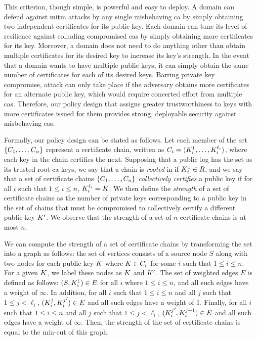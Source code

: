 This criterion, though simple, is powerful and easy to deploy. A domain can
defend against \ac{mitm} attacks by any single misbehaving \ac{ca} by simply
obtaining two independent certificates for its public key. Each domain can tune
its level of resilience against colluding compromised \acp{ca} by simply
obtaining more certificates for its key. Moreover, a domain does not need to do
anything other than obtain multiple certificates for its desired key to increase
its key's strength. In the event that a domain wants to have multiple public
keys, it can simply obtain the same number of certificates for each of its
desired keys. Barring private key compromise,  attack can only take
place if the adversary obtains more certificates for an alternate public key,
which would require concerted effort from multiple \acp{ca}. Therefore, our
policy design that assigns greater trustworthiness to keys with more
certificates issued for them provides strong, deployable security against
misbehaving \acp{ca}.

Formally, our policy design can be stated as follows. Let each member of the set
$\{C_1, \ldots, C_n\}$ represent a certificate chain, written
as $C_i = (K_i^1, \ldots, K_i^{\ell_i})$, where each key in the
chain certifies the next. Supposing that a public log has the set \rootset as
its trusted root \ac{ca} keys, we say that a chain is \emph{rooted} in \rootset
if $K_i^1 \in R$, and we say that a set of certificate chains
$\{C_1, \ldots, C_n\}$ \emph{collectively certifies} a public
key \pk if for all $i$ such that $1 \le i \le n$, $K_i^{\ell_i} = K$. We
then define the \emph{strength} of a set of certificate chains as the number of
private keys corresponding to a public key in the set of chains that must be
compromised to collectively certify a different public key $K'$. We
observe that the strength of a set of $n$ certificate chains is at most $n$.

We can compute the strength of a set of certificate chains by transforming the
set into a graph as follows: the set of vertices consists of a source node $S$
along with two nodes for each public key $K$ where $K \in C_i$ for
some $i$ such that $1 \le i \le n$. For a given $K$, we label these nodes as
$K$ and $K'$. The set of weighted edges $E$ is defined as follows: $(S,
K_i^1) \in E$ for all $i$ where $1 \le i \le n$, and all such edges have a
weight of $\infty$. In addition, for all $i$ such that $1 \le i \le n$ and all
$j$ such that $1 \le j < \ell_i$, $(K_i^j, {K_i^j}') \in E$ and all such
edges have a weight of 1. Finally, for all $i$ such that $1 \le i \le n$ and all
$j$ such that $1 \le j < \ell_i$, $({K_i^j}', K_i^{j+1}) \in E$ and all such
edges have a weight of $\infty$. Then, the strength of the set of certificate
chains is equal to the min-cut of this graph.

